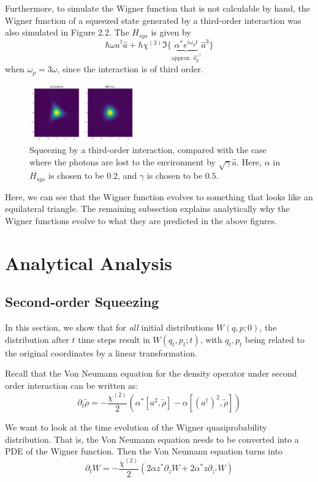 \documentclass[10pt,a4paper]{report}
\begin{document}
Furthermore, to simulate the Wigner function that is not calculable by hand, the Wigner function of a squeezed state generated by a third-order interaction was also simulated in Figure 2.2.
The $H_{sys}$ is given by
\begin{equation}
  \hbar\omega\hat{a}^{\dag}\hat{a}+\hbar\chi^{(3)}\Im\{\underbrace{\alpha^{*} e^{i\omega_{p}t}}_{\text{approx. }\hat{a_{p}}^{\dag}}\hat{a}^{3}\}
\end{equation}
when $\omega_{p}=3\omega$, since the interaction is of third order.
\begin{figure}[htb]
  \centering
  \includegraphics[width=0.4\textwidth]{third_decay_0.5.png}
  \caption{Squeezing by a third-order interaction, compared with the case where the photons are lost to the environment by $\sqrt{\gamma}\hat{a}$. Here, $\alpha$ in $H_{sys}$ is chosen to be $0.2$, and $\gamma$ is chosen to be $0.5$.}
\end{figure}
Here, we can see that the Wigner function evolves to something that looks like an equilateral triangle.
The remaining subsection explains analytically why the Wigner functions evolve to what they are predicted in the above figures.

\section{Analytical Analysis}
\subsection{Second-order Squeezing}
In this section, we show that for \textit{all} initial distributions $W(q, p;0)$, the distribution after $t$ time steps result in $W(q_t,p_t;t)$, with $q_t,p_t$ being related to the original coordinates by a linear transformation.

Recall that the Von Neumann equation for the density operator under second order interaction can be written as:
\[
  \partial_{t}\tilde{\rho}=-\frac{\chi^{(2)}}{2}(\alpha^{*}[a^{2},\tilde{\rho}]-\alpha[(a^{\dag})^{2},\tilde{\rho}])
\]

We want to look at the time evolution of the Wigner quasiprobability distribution.
That is, the Von Neumann equation needs to be converted into a PDE of the Wigner function.
Then the Von Neumann equation turns into
\begin{equation}
  \partial_{t}W=-\frac{\chi^{(2)}}{2}(2\alpha z^{*}\partial_{z}W+2\alpha^{*}z\partial_{z^{*}}W)
\end{equation}
\end{document}
